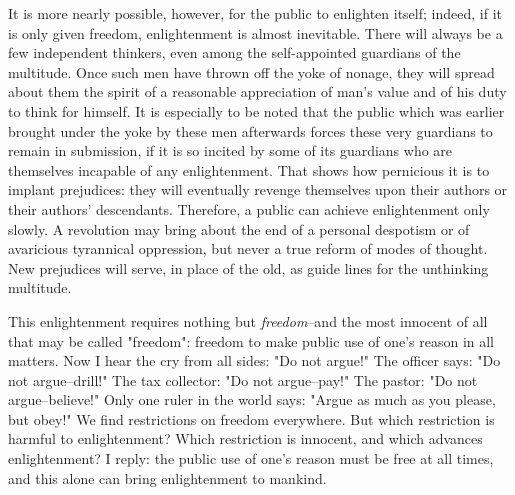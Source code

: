 \documentclass[12pt]{article}
\begin{document}
It is more nearly possible, however, for the public to enlighten itself; indeed, if it is only given freedom, enlightenment is almost inevitable. There will always be a few independent thinkers, even among the self-appointed guardians of the multitude. Once such men have thrown off the yoke of nonage, they will spread about them the spirit of a reasonable appreciation of man's value and of his duty to think for himself. It is especially to be noted that the public which was earlier brought under the yoke by these men afterwards forces these very guardians to remain in submission, if it is so incited by some of its guardians who are themselves incapable of any enlightenment. That shows how pernicious it is to implant prejudices: they will eventually revenge themselves upon their authors or their authors' descendants. Therefore, a public can achieve enlightenment only slowly. A revolution may bring about the end of a personal despotism or of avaricious tyrannical oppression, but never a true reform of modes of thought. New prejudices will serve, in place of the old, as guide lines for the unthinking multitude.

This enlightenment requires nothing but \textit{freedom}--and the most innocent of all that may be called "freedom": freedom to make public use of one's reason in all matters. Now I hear the cry from all sides: "Do not argue!" The officer says: "Do not argue--drill!" The tax collector: "Do not argue--pay!" The pastor: "Do not argue--believe!" Only one ruler in the world says: "Argue as much as you please, but obey!" We find restrictions on freedom everywhere. But which restriction is harmful to enlightenment? Which restriction is innocent, and which advances enlightenment? I reply: the public use of one's reason must be free at all times, and this alone can bring enlightenment to mankind.
\end{document}
